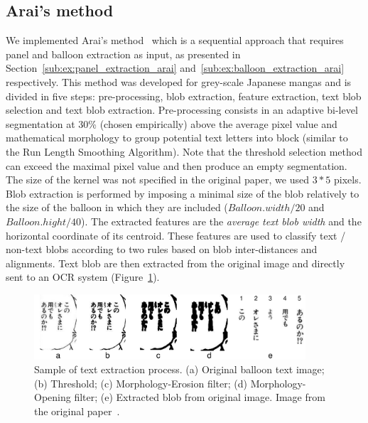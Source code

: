 

\subsection{Arai's method} %
We implemented Arai's method~\cite{Arai11} which is a sequential approach that requires panel and balloon extraction as input, as presented in Section~\ref{sub:ex:panel_extraction_arai} and~\ref{sub:ex:balloon_extraction_arai} respectively.
This method was developed for grey-scale Japanese mangas and is divided in five steps: pre-processing, blob extraction, feature extraction, text blob selection and text blob extraction.
Pre-processing consists in an adaptive bi-level segmentation at 30\% (chosen empirically) above the average pixel value and mathematical morphology to group potential text letters into block (similar to the Run Length Smoothing Algorithm).
Note that the threshold selection method can exceed the maximal pixel value and then produce an empty segmentation.
The size of the kernel was not specified in the original paper, we used $3*5$ pixels.
Blob extraction is performed by imposing a minimal size of the blob relatively to the size of the balloon in which they are included ($Balloon.width / 20$ and $Balloon.hight / 40$).
The extracted features are the \emph{average text blob width} and the horizontal coordinate of its centroid.
These features are used to classify text / non-text blobs according to two rules based on blob inter-distances and alignments.
Text blob are then extracted from the original image and directly sent to an OCR system (Figure~\ref{fig:ex:balloon_extraction_arai}).

\begin{figure}[h]
 \centering
 \includegraphics[width=0.9\textwidth]{balloon_extraction_arai.png}
 \caption[Sample of text extraction process of Arai's method]{Sample of text extraction process. (a) Original balloon text image; (b) Threshold; (c) Morphology-Erosion filter; (d) Morphology-Opening filter; (e) Extracted blob from original image. Image from the original paper~\cite{Arai11}.
 }
 \label{fig:ex:balloon_extraction_arai}
\end{figure}

